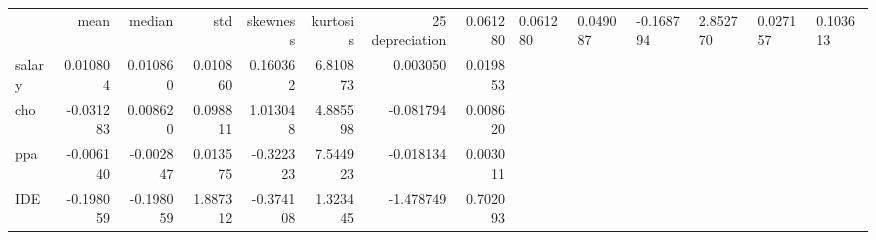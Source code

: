 \begin{tabular}{lrrrrrrr}
\toprule
 & mean & median & std & skewness & kurtosis & 25%
\midrule
depreciation & 0.061280 & 0.061280 & 0.049087 & -0.168794 & 2.852770 & 0.027157 & 0.103613 \\
salary & 0.010804 & 0.010860 & 0.010860 & 0.160362 & 6.810873 & 0.003050 & 0.019853 \\
cho & -0.031283 & 0.008620 & 0.098811 & 1.013048 & 4.885598 & -0.081794 & 0.008620 \\
ppa & -0.006140 & -0.002847 & 0.013575 & -0.322323 & 7.544923 & -0.018134 & 0.003011 \\
IDE & -0.198059 & -0.198059 & 1.887312 & -0.374108 & 1.323445 & -1.478749 & 0.702093 \\
\bottomrule
\end{tabular}

